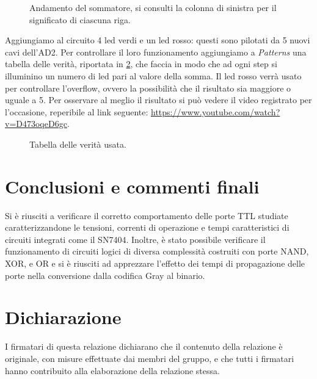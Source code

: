 \documentclass[10pt, a4paper, italian]{article}
\begin{document}
\begin{figure}[htbp]
    \centering
    \caption{Andamento del sommatore, si consulti la colonna di sinistra per il significato di ciascuna riga.}
    \label{fig:faAD2}
\end{figure}

Aggiungiamo al circuito 4 led verdi e un led rosso: questi sono pilotati da 5 nuovi cavi dell'AD2. Per controllare il loro funzionamento aggiungiamo a \emph{Patterns} una tabella delle verità, riportata in \ref{fig:Ver}, che faccia in modo che ad ogni step si illuminino un numero di led pari al valore della somma. Il led rosso verrà usato per controllare l'overflow, ovvero la possibilità che il risultato sia maggiore o uguale a 5. Per osservare al meglio il risultato si può vedere il video registrato per l'occasione, reperibile al link seguente: \url{https://www.youtube.com/watch?v=D473oqeD6gc}.

\begin{figure}[htbp]
    \centering
    \caption{Tabella delle verità usata.}
    \label{fig:Ver}
\end{figure}


\section*{Conclusioni e commenti finali}
Si è riusciti a verificare il corretto comportamento delle porte TTL studiate
caratterizzandone le tensioni, correnti di operazione e tempi caratteristici
di circuiti integrati come il SN7404.
Inoltre, è stato possibile verificare il funzionamento di circuiti logici di
diversa complessità costruiti con porte NAND, XOR, e OR e si è riusciti ad
apprezzare l'effetto dei tempi di propagazione delle porte nella conversione
dalla codifica Gray al binario.

\section*{Dichiarazione}
I firmatari di questa relazione dichiarano che il contenuto della relazione \`e
originale, con misure effettuate dai membri del gruppo, e che tutti i firmatari
hanno contribuito alla elaborazione della relazione stessa.
\end{document}
